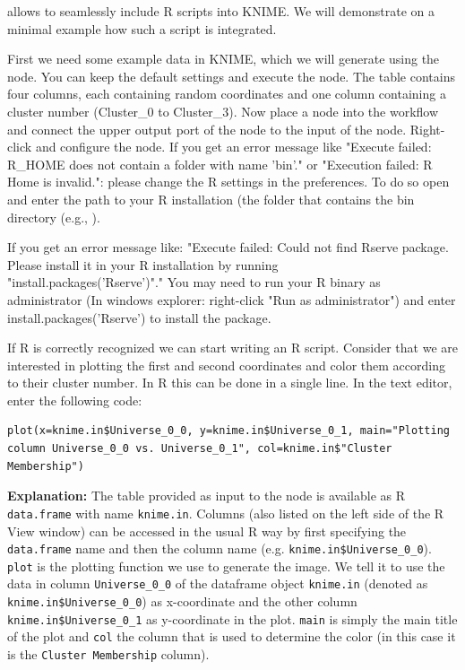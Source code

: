  allows to seamlessly include R scripts into KNIME. We will demonstrate on a minimal 
example how such a script is integrated.

\begin{task}
First we need some example data in KNIME, which we will generate using the  node. You can 
keep the default settings and execute the node. The table contains four columns, each containing random coordinates 
and one column containing a cluster number (Cluster\_0 to Cluster\_3). Now place a  node 
into the workflow and connect the upper output port of the  node to the input of the 
 node. Right-click and configure the node.
If you get an error message like "Execute failed: R\_HOME does not contain a folder with name 'bin'." or "Execution 
failed: R Home is invalid.": please change the R settings in the preferences. To do so open  and enter the path to your R installation (the folder that contains the bin directory (e.g., ).

If you get an error message like:
"Execute failed: Could not find Rserve package. Please install it in your R installation by running \\ 
"install.packages('Rserve')"." You may need to run your R binary as administrator (In windows explorer: right-click 
"Run as administrator") and enter install.packages('Rserve') to install the package.

If R is correctly recognized we can start writing an R script. Consider that we are interested in plotting the first 
and second coordinates and color them according to their cluster number. In R this can be done in a single line.
In the  text editor, enter the following code: \\
\begin{code}
\begin{verbatim}
plot(x=knime.in$Universe_0_0, y=knime.in$Universe_0_1, main="Plotting column Universe_0_0 vs. Universe_0_1", col=knime.in$"Cluster Membership")
\end{verbatim}
\end{code}
        
\textbf{Explanation:}
The table provided as input to the  node is available as R \texttt{data.frame} with name 
\texttt{knime.in}. Columns (also listed on the left side of the R View window) can be accessed in the usual R way by 
first specifying the \texttt{data.frame} name and then the column name (e.g. \texttt{knime.in\$Universe\_0\_0}).
\texttt{plot} is the plotting function we use to generate the image. We tell it to use the data in column 
\texttt{Universe\_0\_0} of the dataframe object \texttt{knime.in} (denoted as \texttt{knime.in\$Universe\_0\_0}) as 
x-coordinate and the other column \texttt{knime.in\$Universe\_0\_1} as y-coordinate in the plot. \texttt{main} is 
simply the main title of the plot and \texttt{col} the column that is used to determine the color (in this case it is 
the \texttt{Cluster Membership} column).


\end{task}
